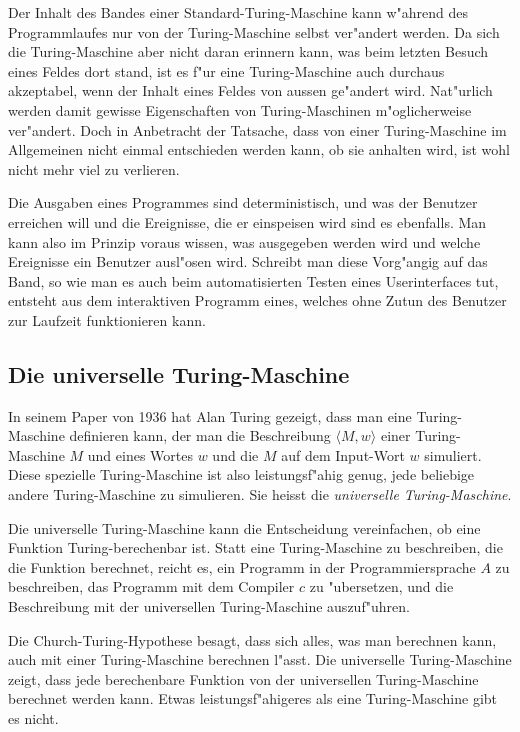Der Inhalt des Bandes einer Standard-Turing-Maschine kann w"ahrend des
Programmlaufes nur von der Turing-Maschine selbst ver"andert werden.
Da sich die Turing-Maschine aber nicht daran erinnern kann, was beim
letzten Besuch eines Feldes dort stand, ist es f"ur eine Turing-Maschine
auch durchaus akzeptabel, wenn der Inhalt eines Feldes von aussen
ge"andert wird. Nat"urlich werden damit gewisse Eigenschaften von
Turing-Maschinen m"oglicherweise ver"andert. Doch in Anbetracht der
Tatsache, dass von einer Turing-Maschine im Allgemeinen nicht einmal
entschieden werden kann, ob sie anhalten wird, ist wohl nicht mehr
viel zu verlieren.

Die Ausgaben eines Programmes sind deterministisch, und was der Benutzer
erreichen will und die Ereignisse, die er einspeisen wird sind es ebenfalls.
Man kann also im Prinzip voraus wissen, was ausgegeben werden wird
und welche Ereignisse ein Benutzer ausl"osen wird. Schreibt man diese
Vorg"angig auf das Band, so wie man es auch beim automatisierten Testen
eines Userinterfaces tut, entsteht aus dem interaktiven Programm eines,
welches ohne Zutun des Benutzer zur Laufzeit funktionieren kann.

\subsection{Die universelle Turing-Maschine}
In seinem Paper von 1936 hat Alan Turing gezeigt, dass man eine
Turing-Maschine definieren kann,
der man die Beschreibung
$\langle M,w\rangle$
einer Turing-Maschine $M$ und eines Wortes $w$
und die $M$ auf dem Input-Wort $w$ simuliert.
Diese spezielle Turing-Maschine ist also leistungsf"ahig genug, jede
beliebige andere Turing-Maschine zu simulieren. Sie heisst die {\em universelle
Turing-Maschine}.

Die universelle Turing-Maschine kann die Entscheidung vereinfachen,
ob eine Funktion Turing-berechenbar ist. Statt eine Turing-Maschine
zu beschreiben, die die Funktion berechnet, reicht es, ein Programm
in der Programmiersprache $A$ zu beschreiben, das Programm mit dem
Compiler $c$ zu "ubersetzen, und die Beschreibung mit der universellen
Turing-Maschine auszuf"uhren.

Die Church-Turing-Hypothese besagt, dass sich alles, was man berechnen
kann, auch mit einer Turing-Maschine berechnen l"asst. Die universelle
Turing-Maschine zeigt, dass jede berechenbare Funktion von der
universellen Turing-Maschine berechnet werden kann.
Etwas leistungsf"ahigeres als eine Turing-Maschine gibt es nicht.

